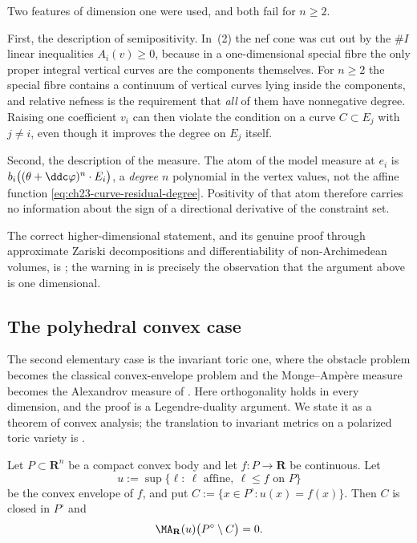 \begin{remark}
\label{rem:ch23-model-slackness-fails}
Two features of dimension one were used, and both fail for \(n\geq2\).

First, the description of semipositivity.  In
\,(2) the nef cone was cut out by the
\(\#I\) linear inequalities \(A_i(v)\geq0\), because in a one-dimensional
special fibre the only proper integral vertical curves are the components
themselves.  For \(n\geq2\) the special fibre contains a continuum of
vertical curves lying inside the components, and relative nefness is the
requirement that \emph{all} of them have nonnegative degree.  Raising one
coefficient \(v_i\) can then violate the condition on a curve
\(C\subset E_j\) with \(j\ne i\), even though it improves the degree on
\(E_j\) itself.

Second, the description of the measure.  The atom of the model measure at
\(e_i\) is \(b_i\bigl((\theta+\ddc\varphi)^n\cdot E_i\bigr)\), a
\emph{degree \(n\)} polynomial in the vertex values, not the affine function
\eqref{eq:ch23-curve-residual-degree}.  Positivity of that atom therefore
carries no information about the sign of a directional derivative of the
constraint set.

The correct higher-dimensional statement, and its genuine proof through
approximate Zariski decompositions and differentiability of non-Archimedean
volumes, is ; the warning in
 is precisely the observation that the
argument above is one dimensional.
\end{remark}

\subsection{The polyhedral convex case}
\label{sec:ch23-convex-orthogonality}

The second elementary case is the invariant toric one, where the obstacle
problem becomes the classical convex-envelope problem and the
Monge--Amp\`ere measure becomes the Alexandrov measure of
.  Here orthogonality holds in every dimension, and
the proof is a Legendre-duality argument.  We state it as a theorem of
convex analysis; the translation to invariant metrics on a polarized toric
variety is .

\begin{theorem}
\label{thm:ch23-convex-envelope-orthogonality}
Let \(P\subset\mathbf R^n\) be a compact convex body and let
\(f:P\to\mathbf R\) be continuous.  Let
\[
 u:=\sup\{\ell:\ \ell\text{ affine},\ \ell\leq f\text{ on }P\}
\]
be the convex envelope of \(f\), and put
\(C:=\{x\in P^\circ:u(x)=f(x)\}\).  Then \(C\) is closed in \(P^\circ\) and
\begin{equation}\label{eq:ch23-convex-orthogonality}
 \MA_{\mathbf R}(u)\bigl(P^\circ\setminus C\bigr)=0 .
\end{equation}
\end{theorem}

